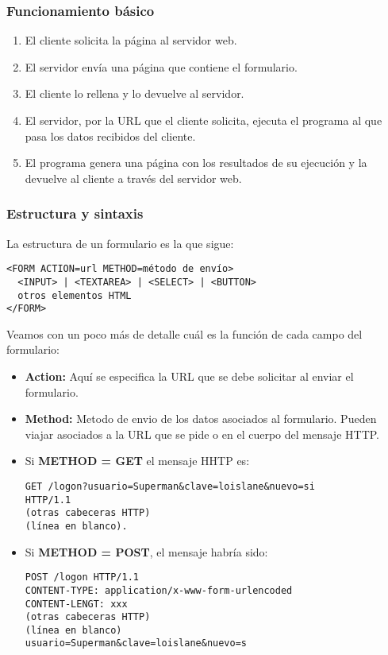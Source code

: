 \documentclass{apuntes}
\begin{document}
\subsubsection{Funcionamiento básico}
\begin{enumerate}
\item El cliente solicita la página al servidor web.
\item El servidor envía una página que contiene el formulario.
\item El cliente lo rellena y lo devuelve al servidor.
\item El servidor, por la URL que el cliente solicita, ejecuta el programa al que pasa los datos recibidos del cliente.
\item El programa genera una página con los resultados de su ejecución y la devuelve al cliente a través del servidor web.
\end{enumerate}

\newpage
\subsubsection{Estructura y sintaxis}
La estructura de un formulario es la que sigue:
\begin{verbatim}
<FORM ACTION=url METHOD=método de envío>
  <INPUT> | <TEXTAREA> | <SELECT> | <BUTTON>
  otros elementos HTML
</FORM>
\end{verbatim}

Veamos con un poco más de detalle cuál es la función de cada campo del formulario:
\begin{itemize}
\item \textbf{Action:} Aquí se especifica la URL que se debe solicitar al enviar el formulario.
\item \textbf{Method:} Metodo de envio de los datos asociados al formulario. Pueden viajar asociados a la URL que se pide o en el cuerpo del mensaje HTTP.
\item Si \textbf{METHOD = GET} el mensaje HHTP es:
\begin{verbatim}
GET /logon?usuario=Superman&clave=loislane&nuevo=si
HTTP/1.1
(otras cabeceras HTTP)
(línea en blanco).
\end{verbatim}
\item Si \textbf{METHOD = POST}, el mensaje habría sido:
\begin{verbatim}
POST /logon HTTP/1.1
CONTENT-TYPE: application/x-www-form-urlencoded
CONTENT-LENGT: xxx
(otras cabeceras HTTP)
(línea en blanco)
usuario=Superman&clave=loislane&nuevo=s
\end{verbatim}
\end{itemize}
\end{document}
